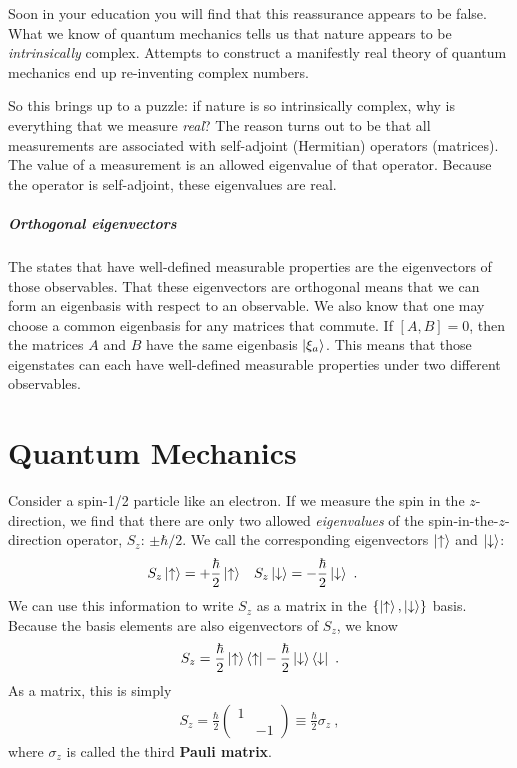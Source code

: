 \documentclass[12pt, oneside]{report}    %
\begin{document}
Soon in your education you will find that this reassurance appears to be false. What we know of quantum mechanics tells us that nature appears to be \emph{intrinsically} complex. Attempts to construct a manifestly real theory of quantum mechanics end up re-inventing complex numbers.

So this brings up to a puzzle: if nature is so intrinsically complex, why is everything that we measure \emph{real}? The reason turns out to be that all measurements are associated with self-adjoint (Hermitian) operators (matrices). The value of a measurement is an allowed eigenvalue of that operator. Because the operator is self-adjoint, these eigenvalues are real. 

\paragraph{Orthogonal eigenvectors} The states that have well-defined measurable properties are the eigenvectors of those observables. That these eigenvectors are orthogonal means that we can form an eigenbasis with respect to an observable. We also know that one may choose a common eigenbasis for any matrices that commute. If $[A,B]=0$, then the matrices $A$ and $B$ have the same eigenbasis $\left|\xi_a\right\rangle$. This means that those eigenstates can each have well-defined measurable properties under two different observables. 


\chapter{Quantum Mechanics}



Consider a spin-1/2 particle like an electron. If we measure the spin in the $z$-direction, we find that there are only two allowed \emph{eigenvalues} of the spin-in-the-$z$-direction operator, $S_z$: $\pm\hbar/2$.
We call the corresponding eigenvectors $\left|\uparrow\right\rangle$ and $\left|\downarrow\right\rangle$:
\begin{align}
    S_z\left|\uparrow\right\rangle &= + \frac{\hbar}{2}\left|\uparrow\right\rangle 
    &
    S_z\left|\downarrow\right\rangle &= - \frac{\hbar}{2}\left|\downarrow\right\rangle \ .
\end{align}
We can use this information to write $S_z$ as a matrix in the $\{\left|\uparrow\right\rangle,\left|\downarrow\right\rangle\}$ basis. Because the basis elements are also eigenvectors of $S_z$, we know
\begin{align}
    S_z = 
    \frac{\hbar}{2}\left|\uparrow\right\rangle\left\langle\uparrow\right|
    -
    \frac{\hbar}{2}\left|\downarrow\right\rangle\left\langle\downarrow\right| \ .
\end{align}
As a matrix, this is simply
\begin{align}
    S_z = \frac{\hbar}{2}
    \begin{pmatrix}
        1 & \\ & -1 
    \end{pmatrix}
    \equiv \frac{\hbar}{2} \sigma_z \ ,
\end{align}
where $\sigma_z$ is called the third \textbf{Pauli matrix}.
\end{document}
